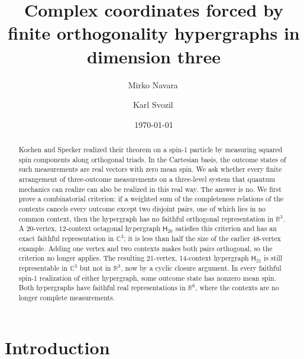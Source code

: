 \documentclass[twocolumn,aps,pra,floatfix,amsmath,amssymb,longbibliography]{revtex4-2}
\newenvironment{handrewrite}{\leavevmode\color{blue}}{}
\theoremstyle{definition}
\theoremstyle{remark}
\newcommand{\C}{\mathbb C}
\newcommand{\R}{\mathbb R}
\newcommand{\Htwenty}{\mathsf H_{20}}
\newcommand{\Htwentyone}{\mathsf H_{21}}
\begin{document}
\title{Complex coordinates forced by finite orthogonality hypergraphs in dimension three}

\author{Mirko Navara\,}

\author{Karl Svozil\,}

\date{\today}

\begin{abstract}
\begin{handrewrite}
Kochen and Specker realized their theorem on a spin-1 particle by measuring squared spin components along orthogonal triads.  In the Cartesian basis, the outcome states of such measurements are real vectors with zero mean spin.  We ask whether every finite arrangement of three-outcome measurements on a three-level system that quantum mechanics can realize can also be realized in this real way.  The answer is no.  We first prove a combinatorial criterion: if a weighted sum of the completeness relations of the contexts cancels every outcome except two disjoint pairs, one of which lies in no common context, then the hypergraph has no faithful orthogonal representation in $\R^3$.  A 20-vertex, 12-context octagonal hypergraph $\Htwenty$ satisfies this criterion and has an exact faithful representation in $\C^3$; it is less than half the size of the earlier 48-vertex example.  Adding one vertex and two contexts makes both pairs orthogonal, so the criterion no longer applies.  The resulting 21-vertex, 14-context hypergraph $\Htwentyone$ is still representable in $\C^3$ but not in $\R^3$, now by a cyclic closure argument.  In every faithful spin-1 realization of either hypergraph, some outcome state has nonzero mean spin.  Both hypergraphs have faithful real representations in $\R^6$, where the contexts are no longer complete measurements.
\end{handrewrite}
\end{abstract}

\maketitle

\section{Introduction}
\label{sec:intro}
\end{document}
